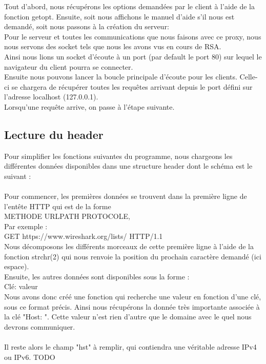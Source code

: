 \documentclass{scrreprt}
\begin{document}
Tout d'abord, nous récupérons les options demandées par le client à l'aide de la fonction getopt. Ensuite, soit nous affichons le manuel d'aide s'il nous est demandé, soit nous passons à la création du serveur:\\
Pour le serveur et toutes les communications que nous faisons avec ce proxy, nous nous servons des socket tels que nous les avons vus en cours de RSA.\\
Ainsi nous lions un socket d'écoute à un port (par default le port 80) sur lequel le navigateur du client pourra se connecter.\\
Ensuite nous pouvons lancer la boucle principale d'écoute pour les clients. Celle-ci se chargera de récupérer toutes les requêtes arrivant depuis le port défini sur l'adresse localhost (127.0.0.1).\\
Lorsqu'une requête arrive, on passe à l'étape suivante.
\subsection{Lecture du header}

Pour simplifier les fonctions suivantes du programme, nous chargeons les différentes données disponibles dans une structure header dont le schéma est le suivant :\\
\\
Pour commencer, les premières données se trouvent dans la première ligne de l'entête HTTP qui est de la forme\\
METHODE URLPATH PROTOCOLE,\\
Par exemple :\\
GET https://www.wireshark.org/lists/ HTTP/1.1\\
Nous décomposons les différents morceaux de cette première ligne à l'aide de la fonction strchr(2) qui nous renvoie la position du prochain caractère demandé (ici espace).\\
Ensuite, les autres données sont disponibles sous la forme :\\
Clé: valeur\\
Nous avons donc créé une fonction qui recherche une valeur en fonction d'une clé, sous ce format précis. Ainsi nous récupérons la donnée très importante associée à la clé "Host: ". Cette valeur n'est rien d'autre que le domaine avec le quel nous devrons communiquer.\\
\\
Il reste alors le champ "hst" à remplir, qui contiendra une véritable adresse IPv4 ou IPv6. TODO
\end{document}
